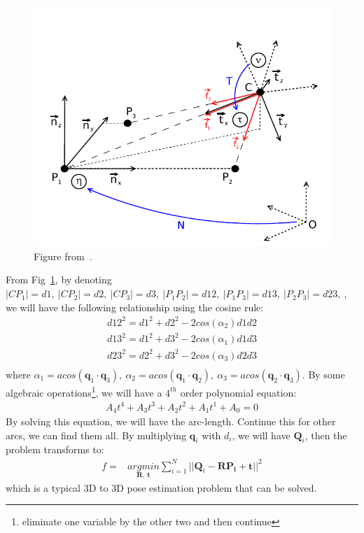 \documentclass[a4paper]{article}
\begin{document}
\begin{figure}
\centering
\includegraphics[scale=0.5]{hand_eye_files/vision/figures/p3p_kneip.png}
\caption{Figure from~\cite{kneip2011novel}.}
\label{fig:p3p}
\end{figure}
From Fig~\ref{fig:p3p}, by denoting $|CP_1|=d1,\ |CP_2|=d2,\ |CP_3|=d3,\ |P_1P_2|=d12,\ |P_1P_3|=d13,\ |P_2P_3|=d23,\ $, we will have the following relationship using the cosine rule:
\begin{align*}
d12^2 = d1^2+d2^2-2cos(\alpha_2)d1d2 \\
d13^2 = d1^2+d3^2-2cos(\alpha_1)d1d3 \\
d23^2 = d2^2+d3^2-2cos(\alpha_3)d2d3 \\
\end{align*}
where $\alpha_1 = acos(\mathbf{q}_1 \cdot \mathbf{q}_3),\ \alpha_2 = acos(\mathbf{q}_1 \cdot \mathbf{q}_2),\ \alpha_3 = acos(\mathbf{q}_2 \cdot \mathbf{q}_3)$. By some algebraic operations\footnote{eliminate one variable by the other two and then continue}, we will have a $4^{th}$ order polynomial equation:
\begin{align*}
A_4 t^4+A_3 t^3+A_2 t^2+A_1 t^1+A_0 = 0
\end{align*}
By solving this equation, we will have the arc-length. Continue this for other arcs, we can find them all. By multiplying $\mathbf{q}_i$ with $d_i$, we will have $\mathbf{Q}_i$, then the problem transforms to:
\begin{align*}
f =& \underset{\mathbf{R},\ \mathbf{t}}{argmin} \sum_{i=1}^{N}||\mathbf{Q}_i-\mathbf{R}\mathbf{P_i}+\mathbf{t}||^2
\end{align*}
which is a typical $3$D to $3$D pose estimation problem that can be solved.
\end{document}

